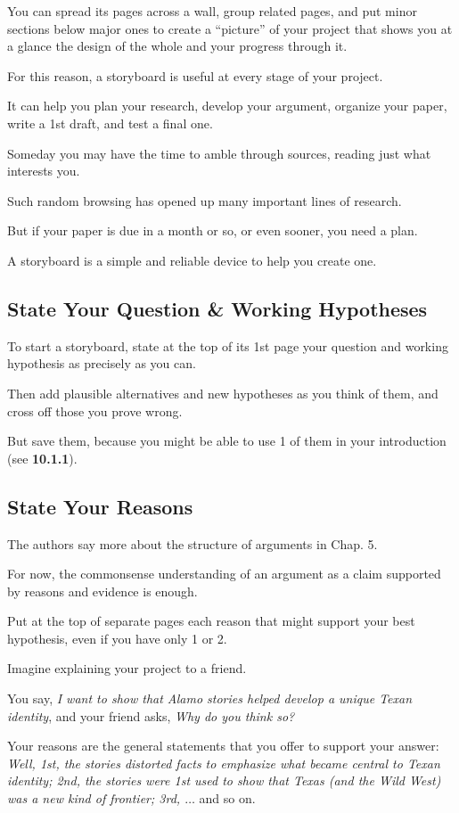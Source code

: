 \documentclass[oneside]{book}
\numberwithin{equation}{section}
\begin{document}
You can spread its pages across a wall, group related pages, and put minor sections below major ones to create a ``picture'' of your project that shows you at a glance the design of the whole and your progress through it.

For this reason, a storyboard is useful at every stage of your project.

It can help you plan your research, develop your argument, organize your paper, write a 1st draft, and test a final one.

%
Someday you may have the time to amble through sources, reading just what interests you.

Such random browsing has opened up many important lines of research.

But if your paper is due in a month or so, or even sooner, you need a plan.

A storyboard is a simple and reliable device to help you create one.

\subsection{State Your Question \& Working Hypotheses}
To start a storyboard, state at the top of its 1st page your question and working hypothesis as precisely as you can.

Then add plausible alternatives and new hypotheses as you think of them, and cross off those you prove wrong.

But save them, because you might be able to use 1 of them in your introduction (see \textbf{10.1.1}).

\subsection{State Your Reasons}
The authors say more about the structure of arguments in Chap. 5.

For now, the commonsense understanding of an argument as a claim supported by reasons and evidence is enough.

Put at the top of separate pages each reason that might support your best hypothesis, even if you have only 1 or 2.

Imagine explaining your project to a friend.

You say, \textit{I want to show that Alamo stories helped develop a unique Texan identity}, and your friend asks, \textit{Why do you think so?}

Your reasons are the general statements that you offer to support your answer: \textit{Well, 1st, the stories distorted facts to emphasize what became central to Texan identity; 2nd, the stories were 1st used to show that Texas (and the Wild West) was a new kind of frontier; 3rd, $\ldots$} and so on.
\end{document}
